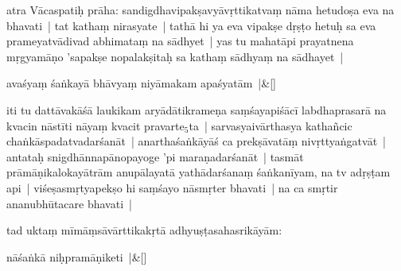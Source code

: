 \documentclass[article,12pt,a4paper]{memoir}%
\newcounter{parCount}
\begin{document}
	  \pstart \leavevmode%
	\hphantom{.}\label{thakur75-42.8}atra Vācaspatiḥ prāha: sandigdhavipakṣavyāvṛttikatvaṃ nāma hetudoṣa eva na bhavati | tat kathaṃ nirasyate | tathā hi ya eva vipakṣe dṛṣṭo hetuḥ sa eva prameyatvādivad abhimataṃ na sādhyet | yas tu mahatāpi prayatnena mṛgyamāṇo 'sapakṣe nopalakṣitaḥ sa kathaṃ sādhyaṃ na sādhayet | 
	    \pend%
	  
	    
	    \stanza[\smallbreak]
	  \label{sarit__ratnakīrtinibandhāvali__111722}avaśyaṃ śaṅkayā bhāvyaṃ niyāmakam apaśyatām |\label{sarit__ratnakīrtinibandhāvali__111823}\&[\smallbreak]
	  
	  
	  
	    \pstart  \leavevmode%
	    \hphantom{.}
	   iti tu dattāvakāśā laukikam aryādātikrameṇa saṃśayapiśācī labdhaprasarā na kvacin nāstīti nāyaṃ kvacit pravarte{\tiny $_{5}$}ta | sarvasyaivārthasya kathañcic chaṅkāspada\label{ratnakīrtinibandhāvali__36r1PF7IMW74UT7SUMA8GL8PWHC}tvadarśanāt\label{ratnakīrtinibandhāvali__36r1PF7IMW6DS4HL565OJR8D4FX} | anarthaśaṅkāyāś ca prekṣāvatāṃ nivṛttyaṅgatvāt | antataḥ snigdhānnapānopayoge 'pi maraṇadarśanāt | tasmāt prāmāṇikalokayātrām anupālayatā yathādarśanaṃ śaṅkanīyam, na tv adṛṣṭam api | viśeṣasmṛtyapekṣo hi saṃśayo nāsmṛter bhavati | na ca smṛtir ananubhūtacare bhavati |
	{}
	\pend%
      

	  \pstart \leavevmode%
	\label{thakur75-42.19}tad uktaṃ mīmāṃsāvārttikakṛ\leavevmode{}tā adhyuṣṭasahasrikāyām: 
	    \pend%
	  
	    
	    \stanza[\smallbreak]
	  nāśaṅkā niḥpramāṇiketi |\&[\smallbreak]
	  
\end{document}
